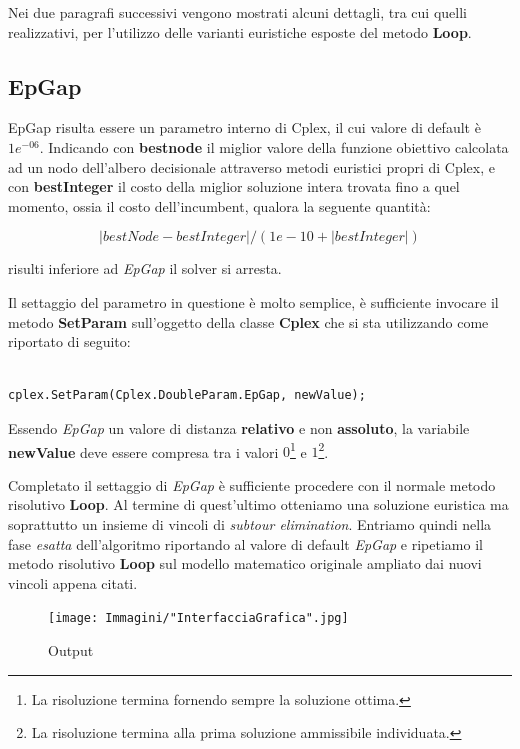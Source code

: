 \documentclass[11pt]{article}
\begin{document}
Nei due paragrafi successivi vengono mostrati alcuni dettagli, tra cui quelli realizzativi, per l'utilizzo delle varianti euristiche esposte del metodo \textbf{Loop}.

\subsection*{EpGap}

EpGap risulta essere un parametro interno di Cplex, il cui valore di default è $1e^{-06}$. Indicando con \textbf{bestnode} il miglior valore della funzione obiettivo calcolata ad un nodo dell'albero decisionale attraverso metodi euristici propri di Cplex, e con \textbf{bestInteger} il costo della miglior soluzione intera trovata fino a quel momento, ossia il costo dell'incumbent, qualora la seguente quantità:

$$|bestNode - bestInteger|/(1e-10 + |bestInteger|)$$

risulti inferiore ad \textit{EpGap} il solver si arresta.

Il settaggio del parametro in questione è molto semplice, è sufficiente invocare il metodo \textbf{SetParam} sull'oggetto della classe \textbf{Cplex} che si sta utilizzando come riportato di seguito:

\begin{lstlisting}

cplex.SetParam(Cplex.DoubleParam.EpGap, newValue);

\end{lstlisting}

Essendo \textit{EpGap} un valore di distanza \textbf{relativo} e non \textbf{assoluto}, la variabile \textbf{newValue} deve essere compresa tra i valori $0$\footnote{La risoluzione termina fornendo sempre la soluzione ottima.} e $1$\footnote{La risoluzione termina alla prima soluzione ammissibile individuata.}.

Completato il settaggio di \textit{EpGap} è sufficiente procedere con il normale metodo risolutivo \textbf{Loop}. Al termine di quest'ultimo otteniamo una soluzione euristica ma soprattutto un insieme di vincoli di \textit{subtour elimination}. Entriamo quindi nella fase \textit{esatta} dell'algoritmo riportando al valore di default \textit{EpGap} e ripetiamo il metodo risolutivo \textbf{Loop} sul modello matematico originale ampliato dai nuovi vincoli appena citati.

\begin{figure}[htbp]
    \centering
    \texttt{[image: Immagini/"InterfacciaGrafica".jpg]}
    \caption{Output}
\end{figure}
\end{document}
